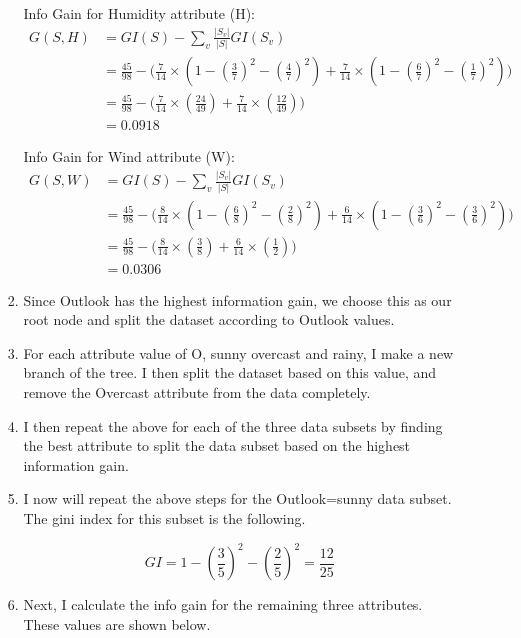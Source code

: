 \documentclass[12pt, fullpage,letterpaper]{article}
\begin{document}
\begin{enumerate}
\begin{enumerate}
\begin{enumerate}
		Info Gain for Humidity attribute (H):
		\[
        		\begin{split}
        			G(S,H) &= GI(S) - \sum_v \frac{|S_v|}{|S|} GI(S_v)
        					\\
        					&= \frac{45}{98} - \Big( \frac{7}{14}\times (1 - (\frac{3}{7})^2 - (\frac{4}{7})^2) + \frac{7}{14}\times (1 - (\frac{6}{7})^2 - (\frac{1}{7})^2) \Big)
        					\\
        					&= \frac{45}{98} - \Big( \frac{7}{14}\times (\frac{24}{49}) + \frac{7}{14}\times (\frac{12}{49}) \Big)
        					\\
        					&= 0.0918
        		\end{split}
			\]
			
		Info Gain for Wind attribute (W):
		\[
        		\begin{split}
        			G(S,W) &= GI(S) - \sum_v \frac{|S_v|}{|S|} GI(S_v)
        					\\
        					&= \frac{45}{98} - \Big( \frac{8}{14}\times (1 - (\frac{6}{8})^2 - (\frac{2}{8})^2) + \frac{6}{14}\times (1 - (\frac{3}{6})^2 - (\frac{3}{6})^2) \Big)
        					\\
        					&= \frac{45}{98} - \Big( \frac{8}{14}\times (\frac{3}{8}) + \frac{6}{14}\times (\frac{1}{2}) \Big)
        					\\
        					&= 0.0306
        		\end{split}
			\]
			
		\item Since Outlook has the highest information gain, we choose this as our root node and split the dataset according to Outlook values. 
		
				\item For each attribute value of O, sunny overcast and rainy, I make a new branch of the tree. I then split the dataset based on this value, and remove the Overcast attribute from the data completely.
		
		\item I then repeat the above for each of the three data subsets by finding the best attribute to split the data subset based on the highest information gain.
		
		\item I now will repeat the above steps for the Outlook=sunny data subset. The gini index for this subset is the following.
		
		\[
			GI = 1 - (\frac{3}{5})^2 - (\frac{2}{5})^2 = \frac{12}{25}
		\]
		
		\item Next, I calculate the info gain for the remaining three attributes. These values are shown below.
		

\end{enumerate}
\end{enumerate}
\end{enumerate}
\end{document}

